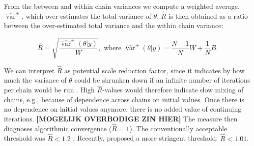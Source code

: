 \documentclass[article]{jss}
\begin{document}
From the between and within chain variances we compute a weighted average, $\widehat{\operatorname{var}}^{+}$, which over-estimates the total variance of $\theta$. $\widehat{R}$ is then obtained as a ratio between the over-estimated total variance and the within chain variance:

\begin{equation*}
\widehat{R}=\sqrt{\frac{\widehat{\operatorname{var}}^{+}(\theta | y)}{W}},
\text{ where } \widehat{\operatorname{var}}^{+}(\theta | y)=\frac{N-1}{N} W+\frac{1}{N} B.
\end{equation*}



% 

We can interpret $\widehat{R}$ as potential scale reduction factor, since it indicates by how much the variance of $\theta$ could be shrunken down if an infinite number of iterations per chain would be run \citep[$t \to \infty$;][]{gelm92}. High $\widehat{R}$-values would therefore indicate slow mixing of chains, e.g., because of dependence across chains on initial values. Once there is no dependence on initial values anymore, there is no added value of continuing iterations. \textbf{[MOGELIJK OVERBODIGE ZIN HIER]} The measure then diagnoses algorithmic convergence ($\widehat{R} = 1$). 
The conventionally acceptable threshold was $\widehat{R} < 1.2$ \cite{gelm92}. Recently, \cite{veht19} proposed a more stringent threshold: $\widehat{R} < 1.01$. 
\end{document}
